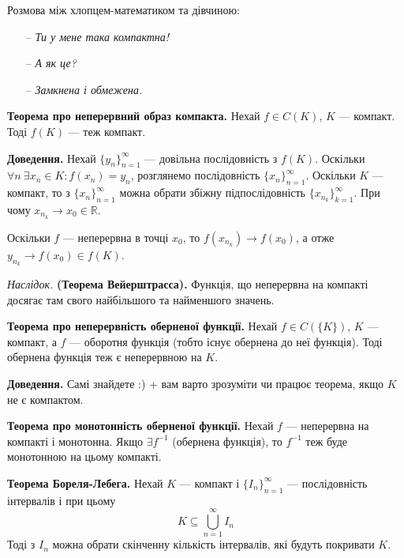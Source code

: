 \documentclass[12pt]{report}
\begin{document}
Розмова між хлопцем-математиком та дівчиною:
\begin{itemize}
    \item[--] \textit{Ти у мене така компактна!}
    \item[--] \textit{А як це?}
    \item[--] \textit{Замкнена і обмежена.}
\end{itemize}

\vspace{5mm}

\textbf{Теорема про неперервний образ компакта.} Нехай $f \in C(K)$, $K$ --- компакт. Тоді $f(K)$ --- теж компакт.

\textbf{Доведення.} Нехай $\{ y_n\}_{n=1}^{\infty}$ --- довільна послідовність з $f(K)$. Оскільки $\forall n\ \exists x_n \in K : f(x_n) = y_n$, розглянемо послідовність $\{ x_n\}_{n=1}^{\infty}$.  Оскільки $K$ --- компакт, то з $\{ x_n\}_{n=1}^{\infty}$ можна обрати збіжну підпослідовність $\{ x_{n_k}\}_{k=1}^{\infty}$. При чому $x_{n_k} \to x_0 \in \mathbb{R}$.

Оскільки $f$ --- неперервна в точці $x_0$, то $f(x_{n_k}) \to f(x_0)$, а отже $y_{n_k} \to f(x_0) \in f(K)$.

\vspace{3mm}

\textit{Наслідок.} \textbf{(Теорема Вейерштрасса).} Функція, що неперервна на компакті досягає там свого найбільшого та найменшого значень.

\vspace{5mm}

\textbf{Теорема про неперервність оберненої функції.} Нехай $f \in C(\{ K\})$, $K$ --- компакт, а $f$ --- оборотня функція (тобто існує обернена до неї функція). Тоді обернена функція теж є неперервною на $K$.

\textbf{Доведення.} Самі знайдете :) + вам варто зрозуміти чи працює теорема, якщо $K$ не є компактом.

\vspace{5mm}

\textbf{Теорема про монотонність оберненої функції.} Нехай $f$ --- неперервна на компакті і монотонна. Якщо $\exists f^{-1}$ (обернена функція), то $f^{-1}$ теж буде монотонною на цьому компакті.

\vspace{5mm}

\textbf{Теорема Бореля-Лебега.} Нехай $K$ --- компакт і $\{ I_n\}_{n=1}^{\infty}$ --- послідовність інтервалів і при цьому 
$$K \subseteq \bigcup\limits_{n=1}^{\infty} I_n$$ 
Тоді з $I_n$ можна обрати скінченну кількість інтервалів, які будуть покривати $K$.
\end{document}
